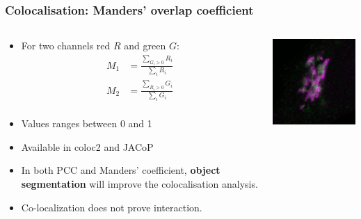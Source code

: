 \documentclass[ignorenonframetext,aspectratio=169,10pt,xcolor=table]{beamer}
\begin{document}
\begin{frame} \frametitle{Colocalisation: Manders' overlap coefficient}
  \begin{columns}
    \begin{column}{0.7\textwidth}
      \begin{itemize}
      \item For two channels red $R$ and green $G$:
      \begin{equation*}
        \begin{array}{ll}
          M_1 &= \frac{\sum_{G_i>0} R_i}{\sum_i R_i}\\
          M_2 &= \frac{\sum_{R_i>0} G_i}{\sum_i G_i}\\
        \end{array}
      \end{equation*}
      \item Values ranges between 0 and 1
      \item Available in coloc2 and JACoP
      \item In both PCC and Manders' coefficient, \textbf{object segmentation} will improve the colocalisation analysis.
      \item \alert{Co-localization does not prove interaction.}
    \end{itemize}
    \end{column}
    \begin{column}{0.3\textwidth}
      \centering
      \includegraphics[width=\textwidth]{colocalization.jpg}
    \end{column}
  \end{columns}
\end{frame}
\end{document}
